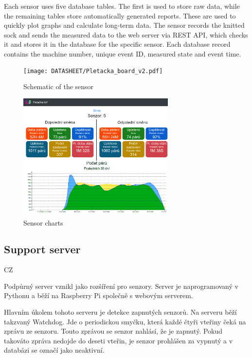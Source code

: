 \documentclass[12pt, a4paper]{article}
\begin{document}
Each sensor uses five database tables. The first is used to store raw data, while the remaining tables store automatically generated reports.
These are used to quickly plot graphs and calculate long-term data.
The sensor records the knitted sock and sends the measured data to the web server via REST API, which checks it and stores it in the database for the specific sensor.
Each database record contains the machine number, unique event ID, measured state and event time.

% 
\begin{figure}[htbp]
    \centering
    \texttt{[image: DATASHEET/Pletacka\_board\_v2.pdf]}
    \caption{Schematic of the sensor}
    \label{fig:Schemav1}
\end{figure}


\begin{figure}[t]
    \centering
    \includegraphics[width=0.7\textwidth]{img/prehled.png}
    \caption{Sensor charts}
    \label{fig:webSenzory}
\end{figure}


\subsection*{Support server}

CZ

Podpůrný server vznikl jako rozšíření pro senzory.
Server je naprogramovaný v Pythonu a běží na Raspberry Pi společně s webovým serverem.\newline

Hlavním úkolem tohoto serveru je detekce zapnutých senzorů.
Na serveru běží takzvaný Watchdog.
Jde o periodickou smyčku, která každé čtyři vteřiny čeká na zprávu ze senzoru.
Touto zprávou se senzor nahlásí, že je zapnutý. Pokud takováto zpráva nedojde do deseti vteřin, je senzor prohlášen za vypnutý a v databázi se označí jako neaktivní.
\end{document}
